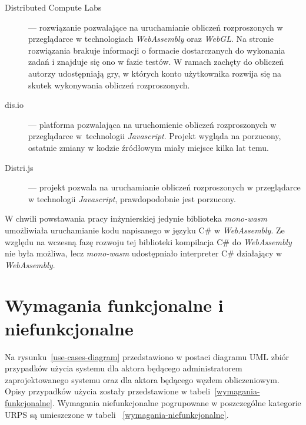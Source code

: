 \documentclass[a4paper,11pt,twoside]{report}
\theoremstyle{definition}
\begin{document}
        \begin{description}
            \item[Distributed Compute Labs~\cite{distributed-compute-labs}] --- rozwiązanie pozwalające na uruchamianie obliczeń rozproszonych w przeglądarce w technologiach \textit{WebAssembly} oraz \textit{WebGL}. Na stronie rozwiązania brakuje informacji o formacie dostarczanych do wykonania zadań i znajduje się ono w fazie testów. W ramach zachęty do obliczeń autorzy udostępniają gry, w których konto użytkownika rozwija się na skutek wykonywania obliczeń rozproszonych.
            \item[dis.io~\cite{dis-io}] --- platforma pozwalająca na uruchomienie obliczeń rozproszonych w przeglądarce w~technologii \textit{Javascript}. Projekt wygląda na porzucony, ostatnie zmiany w kodzie źródłowym miały miejsce kilka lat temu.
            \item[Distri.js~\cite{distri-js}] --- projekt pozwala na uruchamianie obliczeń rozproszonych w przeglądarce w technologii \textit{Javascript}, prawdopodobnie jest porzucony.
        \end{description}
        
        
        W chwili powstawania pracy inżynierskiej jedynie biblioteka \textit{mono-wasm} umożliwiała uruchamianie kodu napisanego w języku C\# w \textit{WebAssembly}.
        Ze względu na wczesną fazę rozwoju tej biblioteki kompilacja C\# do \textit{WebAssembly} nie była możliwa, lecz \textit{mono-wasm} udostępniało interpreter C\# działający w \textit{WebAssembly}.
        
		\section{Wymagania funkcjonalne i niefunkcjonalne}
                
            Na rysunku~\ref{use-cases-diagram} przedstawiono w postaci diagramu UML zbiór przypadków użycia systemu dla aktora będącego administratorem zaprojektowanego systemu oraz dla aktora będącego węzłem obliczeniowym. Opisy przypadków użycia zostały przedstawione w tabeli~\ref{wymagania-funkcjonalne}. Wymagania niefunkcjonalne pogrupowane w poszczególne kategorie URPS są umieszczone w tabeli ~\ref{wymagania-niefunkcjonalne}.
            
\end{document}
